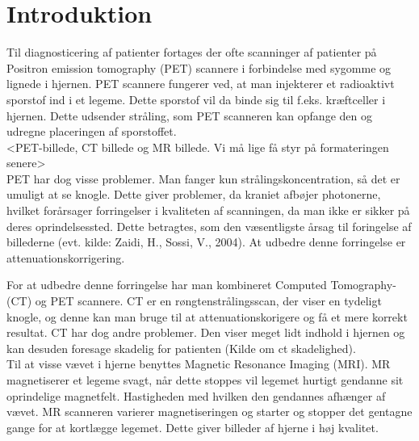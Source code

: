 \section{Introduktion}




Til diagnosticering af patienter fortages der ofte scanninger af patienter på
Positron emission tomography (PET) scannere i forbindelse med sygomme og
lignede i hjernen. PET scannere fungerer ved, at man injekterer et radioaktivt
sporstof ind i et legeme. Dette sporstof vil da binde sig til f.eks.
kræftceller i hjernen. Dette udsender stråling, som PET scanneren kan opfange
den og udregne placeringen af sporstoffet.\\

<PET-billede, CT billede og MR billede. Vi må lige få styr på
formateringen senere>\\

PET har dog visse problemer. Man fanger kun strålingskoncentration, så det
er umuligt at se knogle. Dette giver problemer, da kraniet afbøjer photonerne,
hvilket forårsager forringelser i kvaliteten af scanningen, da man ikke
er sikker på deres oprindelsessted. Dette betragtes, som den væsentligste
årsag til foringelse af billederne (evt. kilde: Zaidi, H., Sossi, V., 2004).
At udbedre denne forringelse er attenuationskorrigering.

For at udbedre denne forringelse har man kombineret Computed Tomography- (CT)
og PET scannere. CT er en røngtenstrålingsscan, der viser en tydeligt knogle,
og denne kan man bruge til at attenuationskorigere og få et mere korrekt
resultat. CT har dog andre problemer. Den viser meget lidt indhold i hjernen og
kan desuden foresage skadelig for patienten (Kilde om ct skadelighed). \\

Til at visse vævet i hjerne benyttes Magnetic Resonance Imaging (MRI). MR
magnetiserer et legeme svagt, når dette stoppes vil legemet hurtigt gendanne
sit oprindelige magnetfelt. Hastigheden med hvilken den gendannes afhænger
af vævet. MR scanneren varierer magnetiseringen og starter og stopper det
gentagne gange for at kortlægge legemet. Dette giver billeder af hjerne i
høj kvalitet. 

